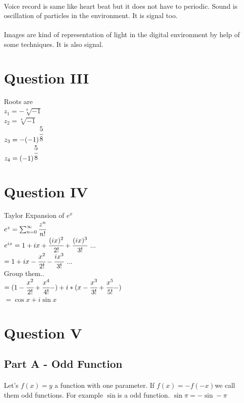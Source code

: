 \documentclass[a4paper, 12pt, titlepage]{article}
\begin{document}
\paragraph{} Voice record is same like heart beat but it does not have to periodic. Sound is oscillation of particles in the environment. It is signal too.
\paragraph{} Images are kind of representation of light in the digital environment by help of some techniques. It is also signal.
\section{Question III}
\begin{center}
Roots are \\
$ z_1 = -\sqrt[8]{-1} $ \\
$ z_2 =  \sqrt[8]{-1} $\\
$ z_3 = -(-1)^{\cfrac{5}{8}} $\\
$ z_4 =  (-1)^{\cfrac{5}{8}} $
\end{center}

\section{Question IV}
\begin{center}
    Taylor Expansion of $ e^{x}$ \\
    $ e^{z} = \sum_{n=0}^{\infty }{\cfrac {z^{n}}{n!}} $ \\
$ e^{ix} = 1+ ix + \cfrac{(ix)^{2}}{2!} + \cfrac{(ix)^3}{3!} $ \space ...\\
$ = 1+ ix - \cfrac{x^2}{2!} - \cfrac{ix^3}{3!} $ \space ... \\
Group them.. \\
$= (1-\cfrac{x^2}{2!}+\cfrac{x^4}{4!}-) + i*(x- \cfrac{x^3}{3!}+\cfrac{x^5}{5!}- )$ \\
$= \cos {x} + i\sin{x}$
\end{center}

\section{Question V}
\subsection{Part A - Odd Function}
\paragraph{}
Let's $ f(x) = y $ \space a function with one parameter. If $ f(x) = -f(-x) $\space we call them odd functions. For example $ \sin$\space is a odd function. $ \sin \pi = -\sin -\pi $
\end{document}
